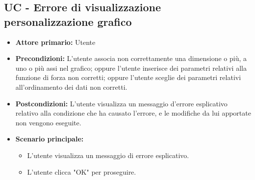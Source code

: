 \subsection{UC - Errore di visualizzazione personalizzazione grafico}
\label{sec:UC - Errore di personalizzazione}
\begin{itemize}
    \item \textbf{Attore primario:} Utente
    \item \textbf{Precondizioni:} L'utente associa non correttamente una dimensione o più, a uno o più assi nel grafico; oppure l'utente inserisce dei parametri relativi alla funzione di forza non corretti; oppure l'utente sceglie dei parametri relativi all'ordinamento dei dati non corretti.
    \item \textbf{Postcondizioni:} L'utente visualizza un messaggio d'errore esplicativo relativo alla condizione che ha causato l'errore, e le modifiche da lui apportate non vengono eseguite.
    \item \textbf{Scenario principale:}  
    \begin{itemize}
        \item L'utente visualizza un messaggio di errore esplicativo.
        \item L'utente clicca "OK" per proseguire.
    \end{itemize}
\end{itemize}